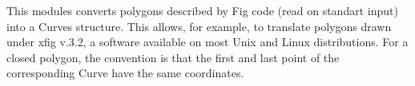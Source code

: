 This modules converts polygons described by Fig code (read on standart
input) into a Curves structure. This allows, for example, to translate
polygons drawn under xfig v.3.2,
a software available on most Unix and Linux distributions.
For a closed polygon, the convention is that the first and last
point of the corresponding Curve have the same coordinates.